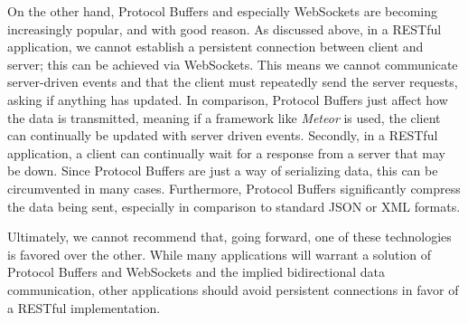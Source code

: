 \documentclass[11pt]{article} %
\begin{document}
On the other hand, Protocol Buffers and especially WebSockets are becoming increasingly popular, and with good reason. As discussed above, in a RESTful application, we cannot establish a persistent connection between client and server; this can be achieved via WebSockets. This means we cannot communicate server-driven events and that the client must repeatedly send the server requests, asking if anything has updated. In comparison, Protocol Buffers just affect how the data is transmitted, meaning if a framework like \textit{Meteor} is used, the client can continually be updated with server driven events. Secondly, in a RESTful application, a client can continually wait for a response from a server that may be down. Since Protocol Buffers are just a way of serializing data, this can be circumvented in many cases. Furthermore, Protocol Buffers significantly compress the data being sent, especially in comparison to standard JSON or XML formats.

Ultimately, we cannot recommend that, going forward, one of these technologies is favored over the other. While many applications will warrant a solution of Protocol Buffers and WebSockets and the implied bidirectional data communication, other applications should avoid persistent connections in favor of a RESTful implementation. 
\end{document}
